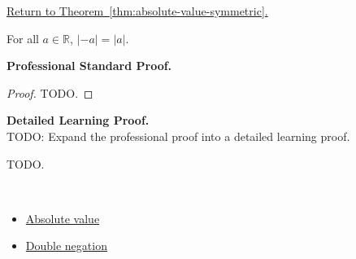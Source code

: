 \newpage
{}
\label{prf:absolute-value-symmetric}

\begin{remark*}[Return]
\hyperref[thm:absolute-value-symmetric]{Return to Theorem~\ref*{thm:absolute-value-symmetric}.}
\end{remark*}

\begin{theorem*}
For all $a \in \mathbb{R}$, $\lvert -a \rvert = \lvert a \rvert$.
\end{theorem*}

\textbf{Professional Standard Proof.}~\\
\begin{proof}
TODO.
\end{proof}

\textbf{Detailed Learning Proof.}~\\
TODO: Expand the professional proof into a detailed learning proof.


\begin{remark*}
TODO.
\end{remark*}

\begin{remark*}[Dependencies]~\\
\begin{itemize}
  \item \hyperref[def:absolute-value]{Absolute value}
  \item \hyperref[thm:double-negation]{Double negation}
\end{itemize}
\end{remark*}
